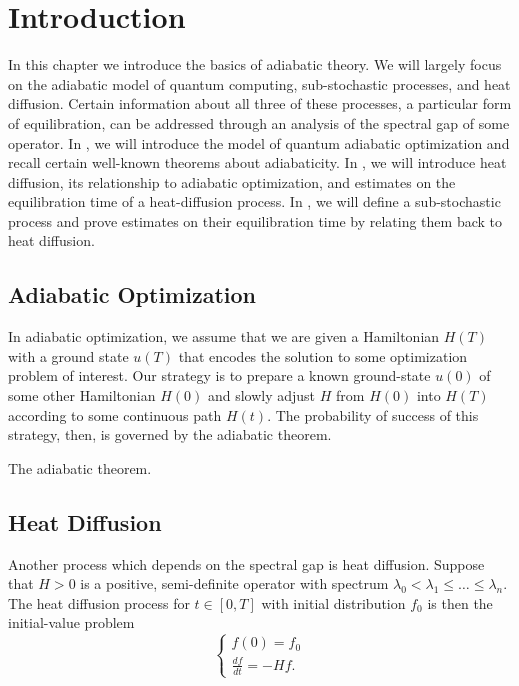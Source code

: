 \chapter{Introduction}

In this chapter we introduce the basics of adiabatic theory. We will largely focus on the adiabatic model of quantum computing, sub-stochastic processes, and heat diffusion. Certain information about all three of these processes, a particular form of equilibration, can be addressed through an analysis of the spectral gap of some operator. In , we will introduce the model of quantum adiabatic optimization and recall certain well-known theorems about adiabaticity. In , we will introduce heat diffusion, its relationship to adiabatic optimization, and estimates on the equilibration time of a heat-diffusion process. In , we will define a sub-stochastic process and prove estimates on their equilibration time by relating them back to heat diffusion. 


\section{Adiabatic Optimization}\label{sec:adiabatic-optimization}

In adiabatic optimization, we assume that we are given a Hamiltonian $H(T)$ with a ground state $u(T)$ that encodes the solution to some optimization problem of interest. Our strategy is to prepare a known ground-state $u(0)$ of some other Hamiltonian $H(0)$ and slowly adjust $H$ from $H(0)$ into $H(T)$ according to some continuous path $H(t)$. The probability of success of this strategy, then, is governed by the adiabatic theorem. 

\begin{thm}\label{thm:adiabatic}
    The adiabatic theorem.
\end{thm}


\section{Heat Diffusion}\label{sec:heat-diffusion}
    Another process which depends on the spectral gap is heat diffusion. Suppose that $H > 0$ is a positive, semi-definite operator with spectrum $\lambda_0 < \lambda_1 \leq \dots \leq \lambda_n$. The heat diffusion process for $t \in [0,T]$ with initial distribution $f_0$ is then the initial-value problem
    \begin{equation}\label{eqn:heat-diffusion}
        \begin{cases}
            f(0) = f_0 \\
            \frac{d f}{d t} = - H f.
        \end{cases}
    \end{equation}
    
